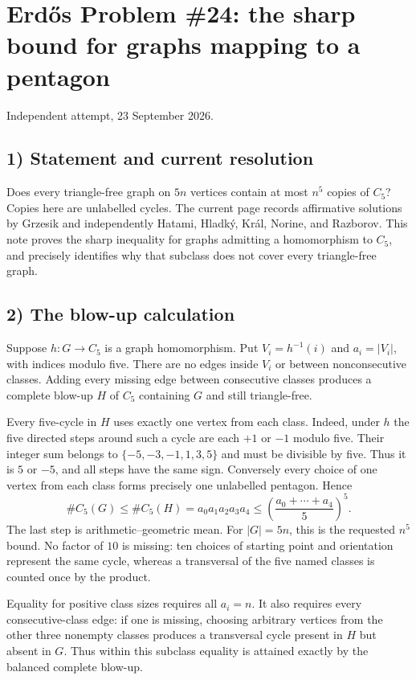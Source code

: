 \section{Erd\H{o}s Problem \#24: the sharp bound for graphs mapping to a pentagon}
\noindent Independent attempt, 23 September 2026.

\subsection*{1) Statement and current resolution}
Does every triangle-free graph on $5n$ vertices contain at most $n^5$ copies of $C_5$? Copies here are unlabelled cycles. The current page records affirmative solutions by Grzesik and independently Hatami, Hladk\'y, Kr\'al, Norine, and Razborov. This note proves the sharp inequality for graphs admitting a homomorphism to $C_5$, and precisely identifies why that subclass does not cover every triangle-free graph.

\subsection*{2) The blow-up calculation}
Suppose $h:G\to C_5$ is a graph homomorphism. Put $V_i=h^{-1}(i)$ and $a_i=|V_i|$, with indices modulo five. There are no edges inside $V_i$ or between nonconsecutive classes. Adding every missing edge between consecutive classes produces a complete blow-up $H$ of $C_5$ containing $G$ and still triangle-free.

Every five-cycle in $H$ uses exactly one vertex from each class. Indeed, under $h$ the five directed steps around such a cycle are each $+1$ or $-1$ modulo five. Their integer sum belongs to $\{-5,-3,-1,1,3,5\}$ and must be divisible by five. Thus it is $5$ or $-5$, and all steps have the same sign. Conversely every choice of one vertex from each class forms precisely one unlabelled pentagon. Hence
\[
 \#C_5(G)\le\#C_5(H)=a_0a_1a_2a_3a_4
 \le\left(\frac{a_0+\cdots+a_4}{5}\right)^5.\tag{1}
\]
The last step is arithmetic--geometric mean. For $|G|=5n$, this is the requested $n^5$ bound. No factor of $10$ is missing: ten choices of starting point and orientation represent the same cycle, whereas a transversal of the five named classes is counted once by the product.

Equality for positive class sizes requires all $a_i=n$. It also requires every consecutive-class edge: if one is missing, choosing arbitrary vertices from the other three nonempty classes produces a transversal cycle present in $H$ but absent in $G$. Thus within this subclass equality is attained exactly by the balanced complete blow-up.

